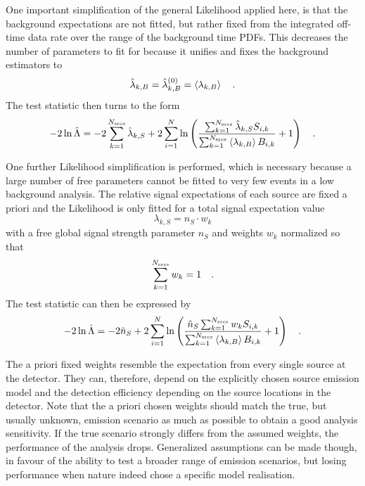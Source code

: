 One important simplification of the general Likelihood applied here, is that the background expectations are not fitted, but rather fixed from the integrated off-time data rate over the range of the background time PDFs.
This decreases the number of parameters to fit for because it unifies and fixes the background estimators to
\begin{equation}
  \hat{\lambda}_{k,B} = \hat{\lambda}_{k,B}^{(0)} = \Braket{\lambda_{k,B}}
  \quad\text{.}
\end{equation}
The test statistic then turns to the form
\begin{equation}
  -2\ln\hat{\Lambda}
  = -2\sum_{k=1}^{N_\text{srcs}}\hat{\lambda}_{k,S} +
      2\sum_{i=1}^N \ln\left(
        \frac{\sum_{k=1}^{N_\text{srcs}}\hat{\lambda}_{k,S} S_{i,k}}
             {\sum_{k=1}^{N_\text{srcs}}\Braket{\lambda_{k,B}} B_{i,k}}
        + 1
      \right)
  \quad\text{.}
\end{equation}

One further Likelihood simplification is performed, which is necessary because a large number of free parameters cannot be fitted to very few events in a low background analysis.
The relative signal expectations of each source are fixed a priori and the Likelihood is only fitted for a total signal expectation value
\begin{equation}
  \label{equ:ns_split_weights_per_src}
  \lambda_{k,S} = n_S \cdot w_k
\end{equation}
with a free global signal strength parameter $n_S$ and weights $w_k$ normalized so that
\begin{equation}
  \sum_{k=1}^{N_\text{srcs}} w_k = 1
  \quad\text{.}
\end{equation}
The test statistic can then be expressed by
\begin{equation}
  \label{equ:tdep_ts_general}
  -2\ln\hat{\Lambda}
  = -2\hat{n}_S +
      2\sum_{i=1}^N \ln\left(
        \frac{\hat{n}_S \sum_{k=1}^{N_\text{srcs}} w_k S_{i,k}}
             {\sum_{k=1}^{N_\text{srcs}}\Braket{\lambda_{k,B}} B_{i,k}}
        + 1
      \right)
  \quad\text{.}
\end{equation}

The a priori fixed weights resemble the expectation from every single source at the detector.
They can, therefore, depend on the explicitly chosen source emission model and the detection efficiency depending on the source locations in the detector.
Note that the a priori chosen weights should match the true, but usually unknown, emission scenario as much as possible to obtain a good analysis sensitivity.
If the true scenario strongly differs from the assumed weights, the performance of the analysis drops.
Generalized assumptions can be made though, in favour of the ability to test a broader range of emission scenarios, but losing performance when nature indeed chose a specific model realisation.



